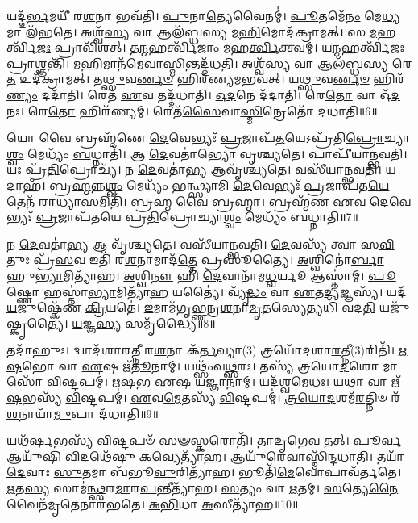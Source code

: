𑌯𑌦𑍍𑌦᳴\-\ul{𑌰𑍍𑌭}\-𑌮𑌯𑍀᳴ 𑌰\-\ul{𑌶}\-𑌨𑌾 𑌭𑌵᳴𑌤𑌿।
\-\ul{𑌪𑍁}\-𑌨𑌾\-\ul{𑌤𑍍𑌯𑍇}\-𑌵𑍈𑌨𑌮𑍍॑।
\-\ul{𑌪𑍂}\-𑌤𑌮𑍇᳴\-\ul{𑌨𑌂} 𑌮𑍇\-\ul{𑌧𑍍𑌯}\-𑌮𑌾 𑌲᳴𑌭𑌤𑍇।
𑌅𑌶𑍍𑌵᳴\-\ul{𑌸𑍍𑌯} 𑌵𑌾 𑌆𑌲᳴𑌬𑍍𑌧𑌸𑍍𑌯 𑌮\-\ul{𑌹𑌿}\-𑌮𑍋𑌦᳴𑌕𑍍𑌰𑌾𑌮𑌤𑍍।
𑌸 \ul{𑌮}\-𑌹𑌰𑍍𑌤𑍍𑌵𑌿᳴\-\ul{𑌜𑌃} 𑌪𑍍𑌰𑌾𑌵𑌿᳴𑌶𑌤𑍍।
𑌤\-\ul{𑌨𑍍𑌮}\-𑌹𑌰𑍍𑌤𑍍𑌵𑌿᳴𑌜𑌾𑌂 𑌮𑌹\-\ul{𑌰𑍍𑌤𑍍𑌵𑌿}\-𑌕𑍍𑌤𑍍𑌵𑌮𑍍।
𑌯\-\ul{𑌨𑍍𑌮}\-𑌹𑌰𑍍𑌤𑍍𑌵𑌿᳴𑌜𑌃 \ul{𑌪𑍍𑌰𑌾}\-𑌶𑍍𑌞𑌨𑍍𑌤𑌿᳴।
\-\ul{𑌮}\-\-\ul{𑌹𑌿}\-𑌮𑌾𑌨᳴\-\ul{𑌮𑍇}\-𑌵𑌾\-\ul{𑌸𑍍𑌮𑌿}\-𑌨𑍍𑌤𑌦𑍍𑌦᳴𑌧𑌤𑌿।
𑌅𑌶𑍍𑌵᳴\-\ul{𑌸𑍍𑌯} 𑌵𑌾 𑌆𑌲᳴𑌬𑍍𑌧\-\ul{𑌸𑍍𑌯} 𑌰𑍇\-\ul{𑌤} 𑌉𑌦᳴𑌕𑍍𑌰𑌾𑌮𑌤𑍍।
𑌤\-\ul{𑌥𑍍𑌸𑍁}\-𑌵\-\ul{𑌰𑍍𑌣}\-\-\ul{𑍞} 𑌹𑌿𑌰᳴𑌣𑍍𑌯𑌮𑌭𑌵𑌤𑍍।
𑌯\-\ul{𑌥𑍍𑌸𑍁}\-𑌵\-\ul{𑌰𑍍𑌣}\-\-\ul{𑍞} 𑌹𑌿𑌰᳴\-\ul{𑌣𑍍𑌯𑌂} 𑌦𑌦𑌾᳴𑌤𑌿।
𑌰𑍇𑌤᳴ \ul{𑌏}\-𑌵 𑌤𑌦𑍍𑌦᳴𑌧𑌾𑌤𑌿।
\-\ul{𑌓}\-\-\ul{𑌦}\-𑌨𑍇 𑌦᳴𑌦𑌾𑌤𑌿।
𑌰𑍇\-\ul{𑌤𑍋} 𑌵𑌾 𑌓᳴\-\ul{𑌦}\-𑌨𑌃।
𑌰𑍇\-\ul{𑌤𑍋} 𑌹𑌿𑌰᳴𑌣𑍍𑌯𑌮𑍍।
𑌰𑍇𑌤᳴\-\ul{𑌸𑍈}\-𑌵𑌾\-\ul{𑌸𑍍𑌮𑌿}\-𑌨𑍍𑌰𑍇𑌤𑍋᳴ 𑌦𑌧𑌾𑌤𑌿॥6॥\anuvakamend[\-\ul{𑌦}\-\-\ul{𑌧𑌾}\-\-\ul{𑌤𑌿} \ul{𑌰𑍁}\-\-\ul{𑌨𑍍𑌧𑍇} \ul{𑌦}\-𑌰𑍍𑌭𑌾 𑌅᳴𑌭\-\ul{𑌵}\-𑌥𑍍𑌷𑌟𑍍 𑌚᳴]

𑌯𑍋 𑌵𑍈 𑌬𑍍𑌰𑌹𑍍𑌮᳴𑌣𑍇 \ul{𑌦𑍇}\-𑌵𑍇𑌭𑍍𑌯𑌃᳴ \ul{𑌪𑍍𑌰}\-𑌜𑌾𑌪᳴\-\ul{𑌤}\-𑌯𑍇\-𑌽𑌪𑍍𑌰᳴𑌤𑌿\-\ul{𑌪𑍍𑌰𑍋}\-𑌚𑍍𑌯𑌾\-\ul{𑌶𑍍𑌵𑌂} 𑌮𑍇𑌧𑍍𑌯𑌂᳴ \ul{𑌬}\-𑌧𑍍𑌨𑌾𑌤𑌿᳴।
𑌆 \ul{𑌦𑍇}\-𑌵𑌤𑌾॑𑌭𑍍𑌯𑍋 𑌵𑍃𑌶𑍍𑌚𑍍𑌯𑌤𑍇।
𑌪𑌾𑌪𑍀᳴𑌯𑌾𑌨𑍍𑌭𑌵𑌤𑌿।
𑌯𑌃 𑌪𑍍𑌰᳴\-\ul{𑌤𑌿}\-𑌪𑍍𑌰𑍋𑌚𑍍𑌯᳴।
𑌨 \ul{𑌦𑍇}\-𑌵𑌤𑌾॑\-\ul{𑌭𑍍𑌯} 𑌆𑌵𑍃᳴𑌶𑍍𑌚𑍍𑌯𑌤𑍇।
𑌵𑌸𑍀᳴𑌯𑌾𑌨𑍍𑌭𑌵𑌤𑌿।
𑌯𑌦𑌾𑌹᳴।
𑌬𑍍𑌰\-\ul{𑌹𑍍𑌮}\-𑌨𑍍𑌨\-\ul{𑌶𑍍𑌵𑌂} 𑌮𑍇𑌧𑍍𑌯𑌂᳴ 𑌭𑌨𑍍𑌥𑍍𑌸𑍍𑌯𑌾𑌮𑌿 \ul{𑌦𑍇}\-𑌵𑍇𑌭𑍍𑌯𑌃᳴ \ul{𑌪𑍍𑌰}\-𑌜𑌾𑌪᳴𑌤\-\ul{𑌯𑍇} 𑌤𑍇𑌨᳴ 𑌰𑌾𑌧𑍍𑌯𑌾\-\ul{𑌸}\-𑌮𑌿𑌤𑌿᳴।
𑌬𑍍𑌰\-\ul{𑌹𑍍𑌮} 𑌵𑍈 \ul{𑌬𑍍𑌰}\-𑌹𑍍𑌮𑌾।
𑌬𑍍𑌰𑌹𑍍𑌮᳴𑌣 \ul{𑌏}\-𑌵 \ul{𑌦𑍇}\-𑌵𑍇𑌭𑍍𑌯𑌃᳴ \ul{𑌪𑍍𑌰}\-𑌜𑌾𑌪᳴𑌤𑌯𑍇 𑌪𑍍𑌰\-\ul{𑌤𑌿}\-𑌪𑍍𑌰𑍋𑌚𑍍𑌯𑌾\-\ul{𑌶𑍍𑌵𑌂} 𑌮𑍇𑌧𑍍𑌯𑌂᳴ 𑌬𑌧𑍍𑌨𑌾𑌤𑌿॥7॥

𑌨 \ul{𑌦𑍇}\-𑌵𑌤𑌾॑\-\ul{𑌭𑍍𑌯} 𑌆 𑌵𑍃᳴𑌶𑍍𑌚𑍍𑌯𑌤𑍇।
𑌵𑌸𑍀᳴𑌯𑌾𑌨𑍍𑌭𑌵𑌤𑌿।
\-\ul{𑌦𑍇}\-𑌵𑌸𑍍𑌯᳴ 𑌤𑍍𑌵𑌾 𑌸\-\ul{𑌵𑌿}\-𑌤𑍁𑌃 𑌪𑍍𑌰᳴\-\ul{𑌸}\-𑌵 𑌇𑌤𑌿᳴ 𑌰\-\ul{𑌶}\-𑌨𑌾𑌮𑌾𑌦᳴\-\ul{𑌤𑍍𑌤𑍇} 𑌪𑍍𑌰𑌸𑍂॑𑌤𑍍𑌯𑍈।
\-\ul{𑌅}\-𑌶𑍍𑌵𑌿𑌨𑍋॑\-\ul{𑌰𑍍𑌬𑌾}\-𑌹𑍁\-\ul{𑌭𑍍𑌯𑌾}\-𑌮𑌿𑌤𑍍𑌯𑌾᳴𑌹।
\-\ul{𑌅}\-𑌶𑍍𑌵𑌿\-\ul{𑌨𑍗} 𑌹𑌿 \ul{𑌦𑍇}\-𑌵𑌾𑌨𑌾᳴𑌮\-\ul{𑌧𑍍𑌵}\-𑌰𑍍𑌯𑍂 𑌆𑌸𑍍𑌤𑌾॑𑌮𑍍।
\-\ul{𑌪𑍂}\-𑌷𑍍𑌣𑍋 𑌹𑌸𑍍𑌤𑌾॑\-\ul{𑌭𑍍𑌯𑌾}\-𑌮𑌿𑌤𑍍𑌯𑌾᳴\-\ul{𑌹} 𑌯𑌤𑍍𑌯𑍈॑।
𑌵𑍍𑌯𑍃᳴\-\ul{𑌦𑍍𑌧𑌂} 𑌵𑌾 \ul{𑌏}\-𑌤\-\ul{𑌦𑍍𑌯}\-𑌜𑍍𑌞𑌸𑍍𑌯᳴।
𑌯𑌦᳴\-\ul{𑌯}\-𑌜𑍁𑌷𑍍𑌕𑍇᳴𑌣 \ul{𑌕𑍍𑌰𑌿}\-𑌯𑌤𑍇॑।
\-\ul{𑌇}\-𑌮𑌾𑌮᳴𑌗𑍃𑌭𑍍𑌣𑌨𑍍𑌰\-\ul{𑌶}\-𑌨𑌾\-\ul{𑌮𑍃}\-𑌤𑌸𑍍𑌯𑍇\-𑌤𑍍𑌯𑌧𑌿᳴ 𑌵𑌦\-\ul{𑌤𑌿} 𑌯𑌜𑍁᳴𑌷𑍍𑌕𑍃𑌤𑍍𑌯𑍈।
\-\ul{𑌯}\-𑌜𑍍𑌞\-\ul{𑌸𑍍𑌯} 𑌸𑌮𑍃᳴𑌦𑍍𑌧𑍍𑌯𑍈॥8॥

𑌤𑌦𑌾᳴𑌹𑍁𑌃।
𑌦𑍍𑌵𑌾𑌦᳴𑌶𑌾𑌰𑌤𑍍𑌨𑍀 𑌰\-\ul{𑌶}\-𑌨𑌾 𑌕᳴\-\ul{𑌰𑍍𑌤}\-𑌵𑍍𑌯𑌾(3) 𑌤𑍍𑌰𑌯𑍋᳴𑌦𑌶𑌾\-\ul{𑌰}\-𑌤𑍍𑌨𑍀(3)\-𑌰𑌿𑌤𑌿᳴।
\-\ul{𑌋}\-\-\ul{𑌷}\-𑌭𑍋 𑌵𑌾 \ul{𑌏}\-𑌷 𑌋᳴\-\ul{𑌤𑍂}\-𑌨𑌾𑌮𑍍।
𑌯𑌥𑍍𑌸𑌂᳴𑌵\-\ul{𑌥𑍍𑌸}\-𑌰𑌃।
𑌤𑌸𑍍𑌯᳴ 𑌤𑍍𑌰𑌯𑍋\-\ul{𑌦}\-𑌶𑍋 𑌮𑌾𑌸𑍋᳴ \ul{𑌵𑌿}\-𑌷𑍍𑌟𑌪𑌮𑍍॑।
\-\ul{𑌋}\-\-\ul{𑌷}\-𑌭 \ul{𑌏}\-𑌷 \ul{𑌯}\-𑌜𑍍𑌞𑌾𑌨𑌾॑𑌮𑍍।
𑌯𑌦᳴𑌶𑍍𑌵\-\ul{𑌮𑍇}\-𑌧𑌃।
𑌯\-\ul{𑌥𑌾} 𑌵𑌾 𑌋᳴\-\ul{𑌷}\-𑌭𑌸𑍍𑌯᳴ \ul{𑌵𑌿}\-𑌷𑍍𑌟𑌪𑌮𑍍॑।
\-\ul{𑌏}\-𑌵\-\ul{𑌮𑍇}\-𑌤𑌸𑍍𑌯᳴ \ul{𑌵𑌿}\-𑌷𑍍𑌟𑌪𑌮𑍍॑।
\-\ul{𑌤𑍍𑌰}\-\-\ul{𑌯𑍋}\-\-\ul{𑌦}\-𑌶𑌮᳴\-\ul{𑌰}\-𑌤𑍍𑌨𑌿𑍞 𑌰᳴\-\ul{𑌶}\-𑌨𑌾𑌯𑌾᳴\-\ul{𑌮𑍁}\-𑌪𑌾 𑌦᳴𑌧𑌾𑌤𑌿॥9॥

𑌯𑌥᳴𑌰𑍍\mbox{}\-\ul{𑌷}\-𑌭𑌸𑍍𑌯᳴ \ul{𑌵𑌿}\-𑌷𑍍𑌟𑌪𑍞᳴ 𑌸𑍟\-\ul{𑌸𑍍𑌕}\-𑌰𑍋𑌤𑌿᳴।
\-\ul{𑌤𑌾}\-𑌦𑍃\-\ul{𑌗𑍇}\-𑌵 𑌤𑌤𑍍।
𑌪𑍂\-\ul{𑌰𑍍𑌵} 𑌆𑌯𑍁᳴𑌷𑌿 \ul{𑌵𑌿}\-𑌦𑌥𑍇᳴𑌷𑍁 \ul{𑌕}\-𑌵𑍍𑌯𑍇𑌤𑍍𑌯𑌾᳴𑌹।
𑌆𑌯𑍁᳴\-\ul{𑌰𑍇}\-𑌵𑌾𑌸𑍍𑌮𑌿᳴𑌨𑍍𑌦𑌧𑌾𑌤𑌿।
𑌤𑌯𑌾᳴ \ul{𑌦𑍇}\-𑌵𑌾𑌃 \ul{𑌸𑍁}\-𑌤𑌮𑌾 𑌬᳴𑌭𑍂\-\ul{𑌵𑍁}\-𑌰𑌿𑌤𑍍𑌯𑌾᳴𑌹।
𑌭𑍂𑌤𑌿᳴\-\ul{𑌮𑍇}\-𑌵𑍋𑌪𑌾𑌵᳴𑌰𑍍𑌤𑌤𑍇।
\-\ul{𑌋}\-𑌤\-\ul{𑌸𑍍𑌯} 𑌸𑌾𑌮॑\-\ul{𑌨𑍍𑌥𑍍𑌸}\-𑌰\-\ul{𑌮𑌾}\-𑌰\-\ul{𑌪}\-𑌨𑍍𑌤𑍀𑌤𑍍𑌯𑌾᳴𑌹।
\-\ul{𑌸}\-𑌤𑍍𑌯𑌂 𑌵𑌾 \ul{𑌋}\-𑌤𑌮𑍍।
\-\ul{𑌸}\-𑌤𑍍𑌯𑍇\-\ul{𑌨𑍈}\-𑌵𑍈𑌨᳴\-\ul{𑌮𑍃}\-𑌤𑍇𑌨𑌾𑌰᳴𑌭𑌤𑍇।
\-\ul{𑌅}\-\-\ul{𑌭𑌿}\-𑌧𑌾 \ul{𑌅}\-𑌸𑍀𑌤𑍍𑌯𑌾᳴𑌹॥10॥

